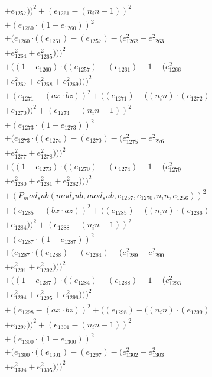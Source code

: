 \documentclass[10pt, a4paper]{article}
\begin{document}
\begin{align*}
& + e_{1257}))^{2} + (e_{1261} - (n_in - 1))^{2} \\
& + (e_{1260}  \cdot  (1 - e_{1260}))^{2} \\
& + (e_{1260}  \cdot  ((e_{1261}) - (e_{1257}) - (e_{1262}^{2} + e_{1263}^{2} \\
& + e_{1264}^{2} + e_{1265}^{2})))^{2} \\
& + ((1 - e_{1260})  \cdot  ((e_{1257}) - (e_{1261}) - 1 - (e_{1266}^{2} \\
& + e_{1267}^{2} + e_{1268}^{2} + e_{1269}^{2})))^{2} \\
& + (e_{1271} - (ax  \cdot  bz))^{2} + ((e_{1271}) - ((n_in)  \cdot  (e_{1272}) \\
& + e_{1270}))^{2} + (e_{1274} - (n_in - 1))^{2} \\
& + (e_{1273}  \cdot  (1 - e_{1273}))^{2} \\
& + (e_{1273}  \cdot  ((e_{1274}) - (e_{1270}) - (e_{1275}^{2} + e_{1276}^{2} \\
& + e_{1277}^{2} + e_{1278}^{2})))^{2} \\
& + ((1 - e_{1273})  \cdot  ((e_{1270}) - (e_{1274}) - 1 - (e_{1279}^{2} \\
& + e_{1280}^{2} + e_{1281}^{2} + e_{1282}^{2})))^{2} \\
& + (P_mod_sub(mod_sub, mod_sub, e_{1257}, e_{1270}, n_in, e_{1256}))^{2} \\
& + (e_{1285} - (bx  \cdot  az))^{2} + ((e_{1285}) - ((n_in)  \cdot  (e_{1286}) \\
& + e_{1284}))^{2} + (e_{1288} - (n_in - 1))^{2} \\
& + (e_{1287}  \cdot  (1 - e_{1287}))^{2} \\
& + (e_{1287}  \cdot  ((e_{1288}) - (e_{1284}) - (e_{1289}^{2} + e_{1290}^{2} \\
& + e_{1291}^{2} + e_{1292}^{2})))^{2} \\
& + ((1 - e_{1287})  \cdot  ((e_{1284}) - (e_{1288}) - 1 - (e_{1293}^{2} \\
& + e_{1294}^{2} + e_{1295}^{2} + e_{1296}^{2})))^{2} \\
& + (e_{1298} - (ax  \cdot  bz))^{2} + ((e_{1298}) - ((n_in)  \cdot  (e_{1299}) \\
& + e_{1297}))^{2} + (e_{1301} - (n_in - 1))^{2} \\
& + (e_{1300}  \cdot  (1 - e_{1300}))^{2} \\
& + (e_{1300}  \cdot  ((e_{1301}) - (e_{1297}) - (e_{1302}^{2} + e_{1303}^{2} \\
& + e_{1304}^{2} + e_{1305}^{2})))^{2} \\

\end{align*}
\end{document}
